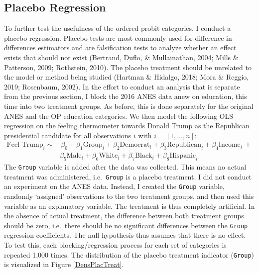\documentclass[12pt,econ]{sources/authesis}
\begin{document}
\hypertarget{ordblock-data-plac}{%
\subsection{Placebo Regression}\label{ordblock-data-plac}}

To further test the usefulness of the ordered probit categories, I conduct a placebo regression. Placebo tests are most commonly used for difference-in-differences estimators and are falsification tests to analyze whether an effect exists that should not exist (Bertrand, Duflo, \& Mullainathan, 2004; Mills \& Patterson, 2009; Rothstein, 2010). The placebo treatment should be unrelated to the model or method being studied (Hartman \& Hidalgo, 2018; Mora \& Reggio, 2019; Rosenbaum, 2002). In the effort to conduct an analysis that is separate from the previous section, I block the 2016 ANES data anew on education, this time into two treatment groups. As before, this is done separately for the original ANES and the OP education categories. We then model the following OLS regression on the feeling thermometer towards Donald Trump as the Republican presidential candidate for all observations \(i\) with \(i = [1,\ldots,n]\):
\begin{align}
\text{Feel Trump}_i \sim & \,\beta_0 + \beta_1 \text{Group}_i + \beta_2 \text{Democrat}_i + \beta_3 \text{Republican}_i + \beta_4 \text{Income}_i \,+ \nonumber \\ 
& \beta_5 \text{Male}_i + \beta_6 \text{White}_i + \beta_7 \text{Black}_i + \beta_8 \text{Hispanic}_i
\end{align}
The \texttt{Group} variable is added after the data was collected. This means no actual treatment was administered, i.e.~\texttt{Group} is a placebo treatment. I did not conduct an experiment on the ANES data. Instead, I created the \texttt{Group} variable, randomly `assigned' observations to the two treatment groups, and then used this variable as an explanatory variable. The treatment is thus completely artificial. In the absence of actual treatment, the difference between both treatment groups should be zero, i.e.~there should be no significant differences between the \texttt{Group} regression coefficients. The null hypothesis thus assumes that there is no effect. To test this, each blocking/regression process for each set of categories is repeated 1,000 times. The distribution of the placebo treatment indicator (\texttt{Group}) is visualized in Figure \ref{DensPlacTreat}.
\end{document}
